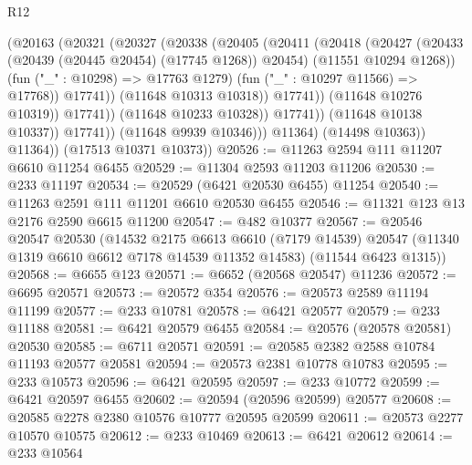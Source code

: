 \begin{lexlean}{R12}
\begin{coremodule}
{{{{{{{{{{{{{{{{{{{{{{{{{{{{{{{{{{{{{{{{{{{{{{{{{{{{{{{{{{{{{{{{{{{{{{{{{{{{{{{{{{                                  (@20163
                                    (@20321
                                      (@20327
                                        (@20338
                                          (@20405
                                            (@20411
                                              (@20418
                                                (@20427
                                                  (@20433
                                                    (@20439 (@20445 @20454) (@17745 @1268))
                                                    @20454)
                                                  (@11551 @10294 @1268))
                                                (fun ("_" : @10298) => @17763 @1279)
                                                (fun ("_" : @10297 @11566) => @17768))
                                              @17741))
                                          (@11648 @10313 @10318))
                                        @17741))
                                    (@11648 @10276 @10319))
                                  @17741))
                              (@11648 @10233 @10328))
                            @17741))
                        (@11648 @10138 @10337))
                      @17741))
                  (@11648 @9939 @10346)))
              @11364)
            (@14498 @10363))
          @11364))
      (@17513 @10371 @10373))
@20526 := @11263 @2594 @111 @11207 @6610 @11254 @6455
@20529 := @11304 @2593 @11203 @11206
@20530 := @233 @11197
@20534 := @20529 (@6421 @20530 @6455) @11254
@20540 := @11263 @2591 @111 @11201 @6610 @20530 @6455
@20546 := @11321 @123 @13 @2176 @2590 @6615 @11200
@20547 := @482 @10377
@20567 := @20546
    @20547
    @20530
    (@14532
      @2175
      @6613
      @6610
      (@7179 @14539)
      @20547
      (@11340 @1319 @6610 @6612 @7178 @14539 @11352 @14583)
      (@11544 @6423 @1315))
@20568 := @6655 @123
@20571 := @6652 (@20568 @20547) @11236
@20572 := @6695 @20571
@20573 := @20572 @354
@20576 := @20573 @2589 @11194 @11199
@20577 := @233 @10781
@20578 := @6421 @20577
@20579 := @233 @11188
@20581 := @6421 @20579 @6455
@20584 := @20576 (@20578 @20581) @20530
@20585 := @6711 @20571
@20591 := @20585 @2382 @2588 @10784 @11193 @20577 @20581
@20594 := @20573 @2381 @10778 @10783
@20595 := @233 @10573
@20596 := @6421 @20595
@20597 := @233 @10772
@20599 := @6421 @20597 @6455
@20602 := @20594 (@20596 @20599) @20577
@20608 := @20585 @2278 @2380 @10576 @10777 @20595 @20599
@20611 := @20573 @2277 @10570 @10575
@20612 := @233 @10469
@20613 := @6421 @20612
@20614 := @233 @10564
}}}}}}}}}}}}}}}}}}}}}}}}}}}}}}}}}}}}}}}}}}}}}}}}}}}}}}}}}}}}}}}}}}}}}}}}}}}}}}}}}}
\end{coremodule}
\end{lexlean}

